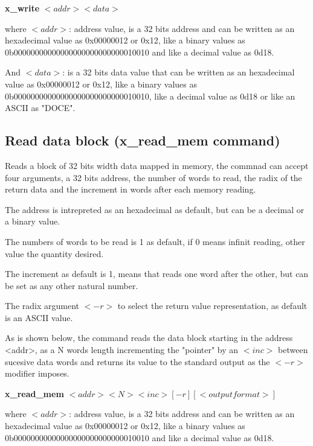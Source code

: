 \documentclass{article}
\begin{document}
\vspace{5mm}

\textbf{x\_write} $<addr>  <data>$

\vspace{5mm}

where $<addr>$: address value, is a 32 bits address and can be written as an hexadecimal value as 0x00000012 or 0x12, like a 
binary values as 0b00000000000000000000000000010010 and like a decimal value as 0d18.

\vspace{2mm}

And $<data>$: is a 32 bits data value that can be written as an hexadecimal value as 0x00000012 or 0x12, like a 
binary values as 0b00000000000000000000000000010010, like a decimal value as 0d18 or like an ASCII as "DOCE".


\subsection{Read data block (x\_read\_mem command)}
Reads a block of 32 bits width data mapped in memory, the commnad can accept four arguments, a 32 bits address, the number
of words to read, the radix of the return data and the increment in words after each memory reading.

The address is intrepreted as an hexadecimal as default, but can be a decimal or a binary value.

The numbers of words to be read is 1 as default, if 0 means infinit reading, other value the quantity desired.

The increment as default is 1, means that reads one word after the other, but can be set as any other natural number. 


The radix argument $<-r>$ to select the return value representation, as default is an ASCII value.

As is shown below, the command reads the data block starting in the address <addr>, as a N words length incrementing the 
"pointer" by an $<inc>$ between sucesive data words and returns its value to the standard output as the $<-r>$ modifier 
imposes.

\vspace{5mm}

\textbf{x\_read\_mem} $<addr> <N> <inc> [-r] [<output format>]$

\vspace{5mm}

where $<addr>$: address value, is a 32 bits address and can be written as an hexadecimal value as 0x00000012 or 0x12, like a 
binary values as 0b00000000000000000000000000010010 and like a decimal value as 0d18.
\end{document}
